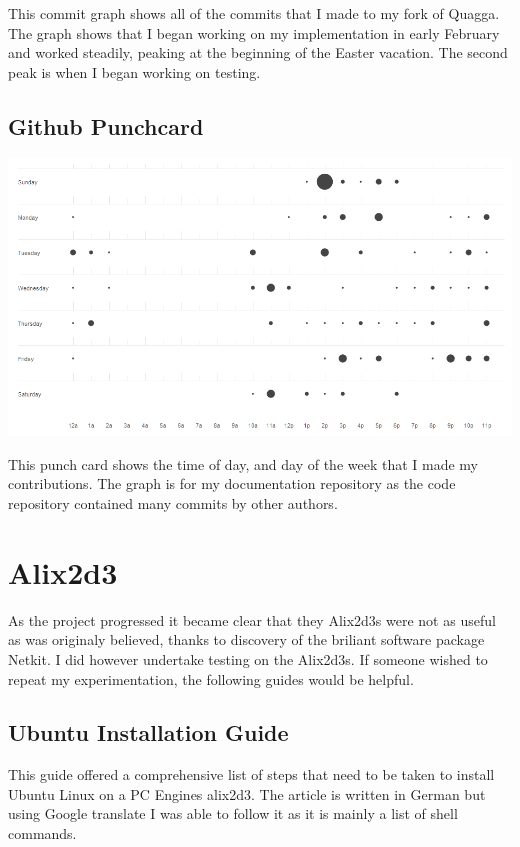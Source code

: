 This commit graph shows all of the commits that I made to my fork of Quagga.
The graph shows that I began working on my implementation in early February and
worked steadily, peaking at the beginning of the Easter vacation. The second
peak is when I began working on testing.


\section{Github Punchcard}
\begin{center}
	\includegraphics[width=\linewidth]{../Diagrams/Stats/GitHubPunchCard.png}
\end{center}

This punch card shows the time of day, and day of the week that I made 
my contributions. The graph is for my documentation repository as the code
repository contained many commits by other authors.

\chapter{Alix2d3}
As the project progressed it became clear that they Alix2d3s were not as useful
as was originaly believed, thanks to discovery of the briliant software package
Netkit. I did however undertake testing on the Alix2d3s. If someone wished to
repeat my experimentation, the following guides would be helpful. 

\section{Ubuntu Installation Guide}

 This guide\cite{germanGuide} offered a comprehensive list of steps that need to
 be taken to install Ubuntu Linux on a PC Engines alix2d3\cite{alix2d3}.  The article is
 written in German but using Google translate I was able to follow it as it is
 mainly a list of shell commands.

